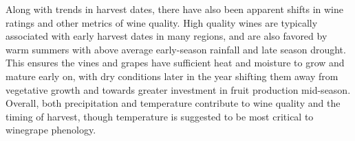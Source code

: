 \documentclass[final]{nature}
\begin{document}
\indent Along with trends in harvest dates, there have also been apparent shifts in wine ratings\cite{jones2005} and other metrics of wine quality\cite{Jones:2000br,mori2007}. High quality wines are typically associated with early harvest dates in many regions\cite{Jones:2000br,jones2005}, and are also favored by warm summers with above average early-season rainfall and late season drought. This ensures the vines and grapes have sufficient heat and moisture to grow and mature early on, with dry conditions later in the year shifting them away from vegetative growth and towards greater investment in fruit production mid-season\cite{chaves2010,jones2013,baciocco2014}. Overall, both precipitation\cite{vanlee2009} and temperature\cite{baciocco2014} contribute to wine quality and the timing of harvest\cite{odo2012,webb2012}, though temperature is suggested to be most critical to winegrape phenology\cite{coombe1987,jones2005}.\\
\end{document}
